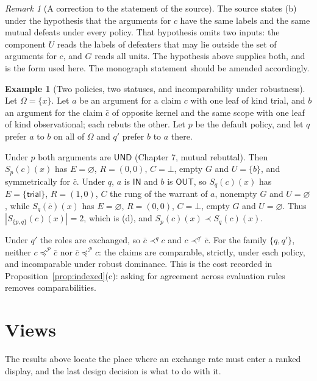\documentclass[11pt]{article}
\theoremstyle{plain}
\theoremstyle{definition}
\newtheorem{example}[theorem]{Example}
\theoremstyle{remark}
\newtheorem{remark}[theorem]{Remark}
\newcommand{\IN}{\textsf{IN}}
\newcommand{\OUT}{\textsf{OUT}}
\newcommand{\UND}{\textsf{UND}}
\begin{document}
\begin{remark}[A correction to the statement of the source]
The source states (b) under the hypothesis that the arguments for $c$ have the same labels and the same mutual defeats under every policy. That hypothesis omits two inputs: the component $U$ reads the labels of defeaters that may lie outside the set of arguments for $c$, and $G$ reads all units. The hypothesis above supplies both, and is the form used here. The monograph statement should be amended accordingly.
\end{remark}

\begin{example}[Two policies, two statuses, and incomparability under robustness]\label{ex:split}
Let $\Omega=\{x\}$. Let $a$ be an argument for a claim $c$ with one leaf of kind \textsf{trial}, and $b$ an argument for the claim $\bar c$ of opposite kernel and the same scope with one leaf of kind \textsf{observational}; each rebuts the other. Let $p$ be the default policy, and let $q$ prefer $a$ to $b$ on all of $\Omega$ and $q'$ prefer $b$ to $a$ there.

Under $p$ both arguments are $\UND$ (Chapter 7, mutual rebuttal). Then $S_p(c)(x)$ has $E=\varnothing$, $R=(0,0)$, $C=\bot$, empty $G$ and $U=\{b\}$, and symmetrically for $\bar c$. Under $q$, $a$ is $\IN$ and $b$ is $\OUT$, so $S_q(c)(x)$ has $E=\{\textsf{trial}\}$, $R=(1,0)$, $C$ the rung of the warrant of $a$, nonempty $G$ and $U=\varnothing$, while $S_q(\bar c)(x)$ has $E=\varnothing$, $R=(0,0)$, $C=\bot$, empty $G$ and $U=\varnothing$. Thus $|S_{\{p,q\}}(c)(x)|=2$, which is (d), and $S_p(c)(x)\prec S_q(c)(x)$.

Under $q'$ the roles are exchanged, so $\bar c\prec^{q}c$ and $c\prec^{q'}\bar c$. For the family $\{q,q'\}$, neither $c\preceq^{\mathcal P}\bar c$ nor $\bar c\preceq^{\mathcal P}c$: the claims are comparable, strictly, under each policy, and incomparable under robust dominance. This is the cost recorded in Proposition~\ref{prop:indexed}(c): asking for agreement across evaluation rules removes comparabilities.
\end{example}

\section{Views}\label{sec:views}

The results above locate the place where an exchange rate must enter a ranked display, and the last design decision is what to do with it.
\end{document}
